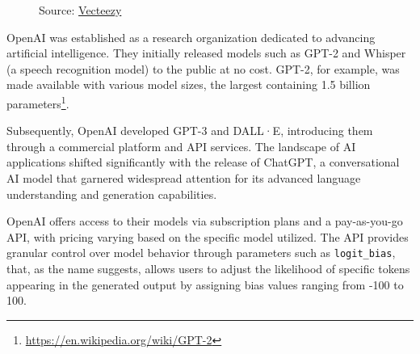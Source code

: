 \begin{figure}
  \centering
  \def\stackalignment{r}
  {\scriptsize \parbox[t]{\linewidth}{Source: \href{https://www.vecteezy.com/png/22227364-openai-chatgpt-logo-icon}{Vecteezy}}}
\end{figure}

OpenAI was established as a research organization dedicated to advancing
artificial intelligence. They initially released models such as GPT-2\cite{Radford2019LanguageMA}
and Whisper\cite{radford2022robustspeechrecognitionlargescale} (a speech
recognition model) to the public at no cost. GPT-2, for example, was made
available with various model sizes, the largest containing 1.5 billion parameters\footnote{\url{https://en.wikipedia.org/wiki/GPT-2}}.

Subsequently, OpenAI developed GPT-3 and DALL·E\cite{ramesh2021zeroshottexttoimagegeneration},
introducing them through a commercial platform and API services. The landscape
of AI applications shifted significantly with the release of ChatGPT, a conversational
AI model that garnered widespread attention for its advanced language understanding
and generation capabilities.

OpenAI offers access to their models via subscription plans and a pay-as-you-go API,
with pricing varying based on the specific model utilized. The API provides granular
control over model behavior through parameters such as \texttt{logit\_bias}, that,
as the name suggests, allows users to adjust the likelihood of specific tokens appearing
in the generated output by assigning bias values ranging from -100 to 100.

